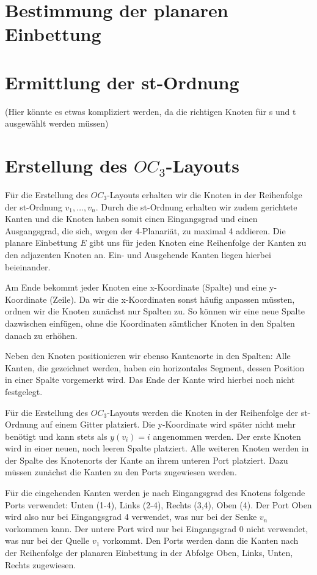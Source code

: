 \documentclass[a4paper]{scrreprt}
\theoremstyle{definition}
\begin{document}
\section{Bestimmung der planaren Einbettung}


\section{Ermittlung der st-Ordnung}

(Hier könnte es etwas kompliziert werden, da die richtigen Knoten für s und t ausgewählt werden müssen)

\section{Erstellung des $OC_3$-Layouts}

Für die Erstellung des $OC_3$-Layouts erhalten wir die Knoten in der Reihenfolge der st-Ordnung $v_1, \dots, v_n$. Durch die st-Ordnung erhalten wir zudem gerichtete Kanten und die Knoten haben somit einen Eingangsgrad und einen Ausgangsgrad, die sich, wegen der 4-Planariät, zu maximal 4 addieren. Die planare Einbettung $E$ gibt uns für jeden Knoten eine Reihenfolge der Kanten zu den adjazenten Knoten an. Ein- und Ausgehende Kanten liegen hierbei beieinander. 

Am Ende bekommt jeder Knoten eine x-Koordinate (Spalte) und eine y-Koordinate (Zeile). Da wir die x-Koordinaten sonst häufig anpassen müssten, ordnen wir die Knoten zunächst nur Spalten zu. So können wir eine neue Spalte dazwischen einfügen, ohne die Koordinaten sämtlicher Knoten in den Spalten danach zu erhöhen. 

Neben den Knoten positionieren wir ebenso Kantenorte in den Spalten: Alle Kanten, die gezeichnet werden, haben ein horizontales Segment, dessen Position in einer Spalte vorgemerkt wird. Das Ende der Kante wird hierbei noch nicht festgelegt.

Für die Erstellung des $OC_3$-Layouts werden die Knoten in der Reihenfolge der st-Ordnung auf einem Gitter platziert. Die y-Koordinate wird später nicht mehr benötigt und kann stets als $y(v_i) = i$ angenommen werden. Der erste Knoten wird in einer neuen, noch leeren Spalte platziert. Alle weiteren Knoten werden in der Spalte des Knotenorts der Kante an ihrem unteren Port platziert. Dazu müssen zunächst die Kanten zu den Ports zugewiesen werden.

Für die eingehenden Kanten werden je nach Eingangsgrad des Knotens folgende Ports verwendet: Unten (1-4), Links (2-4), Rechts (3,4), Oben (4). Der Port Oben wird also nur bei Eingangsgrad 4 verwendet, was nur bei der Senke $v_n$ vorkommen kann. Der untere Port wird nur bei Eingangsgrad 0 nicht verwendet, was nur bei der Quelle $v_1$ vorkommt. Den Ports werden dann die Kanten nach der Reihenfolge der planaren Einbettung in der Abfolge Oben, Links, Unten, Rechts zugewiesen.
\end{document}
